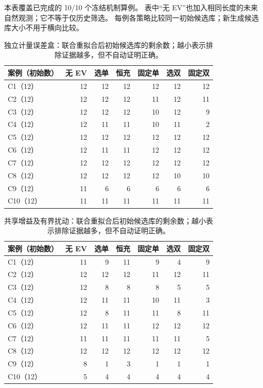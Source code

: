 \noindent 本表覆盖已完成的 10/10 个冻结机制算例。
表中“无 EV”也加入相同长度的未来自然观测；它不等于仅历史筛选。
每例各策略比较同一初始候选库；新生成候选库大小不用于横向比较。
\begin{table}[htbp]\centering\small
\begin{tabular}{lrrrrrr}\toprule
案例（初始数） & 无 EV & 选单 & 恒充 & 固定单 & 选双 & 固定双\\\midrule
C1（12） & 12 & 12 & 12 & 12 & 12 & 12\\
C2（12） & 12 & 12 & 12 & 11 & 12 & 11\\
C3（12） & 12 & 12 & 12 & 10 & 12 & 9\\
C4（12） & 12 & 11 & 11 & 10 & 11 & 2\\
C5（12） & 12 & 12 & 12 & 12 & 12 & 12\\
C6（12） & 12 & 11 & 11 & 12 & 12 & 12\\
C7（12） & 12 & 12 & 12 & 12 & 12 & 12\\
C8（12） & 12 & 12 & 12 & 12 & 10 & 10\\
C9（12） & 11 & 6 & 6 & 6 & 6 & 6\\
C10（12） & 11 & 11 & 11 & 11 & 11 & 11\\
\bottomrule\end{tabular}
\caption{独立计量误差盒：联合重拟合后初始候选库的剩余数；越小表示排除证据越多，但不自动证明正确。}
\end{table}
\begin{table}[htbp]\centering\small
\begin{tabular}{lrrrrrr}\toprule
案例（初始数） & 无 EV & 选单 & 恒充 & 固定单 & 选双 & 固定双\\\midrule
C1（12） & 11 & 9 & 11 & 9 & 4 & 9\\
C2（12） & 12 & 12 & 12 & 11 & 12 & 11\\
C3（12） & 12 & 8 & 8 & 8 & 5 & 5\\
C4（12） & 12 & 11 & 11 & 10 & 11 & 3\\
C5（12） & 12 & 8 & 11 & 11 & 8 & 11\\
C6（12） & 12 & 11 & 11 & 12 & 12 & 12\\
C7（12） & 11 & 11 & 11 & 11 & 11 & 5\\
C8（12） & 12 & 12 & 12 & 12 & 12 & 12\\
C9（12） & 8 & 1 & 3 & 1 & 1 & 1\\
C10（12） & 5 & 4 & 4 & 4 & 4 & 4\\
\bottomrule\end{tabular}
\caption{共享增益及有界扰动：联合重拟合后初始候选库的剩余数；越小表示排除证据越多，但不自动证明正确。}
\end{table}

